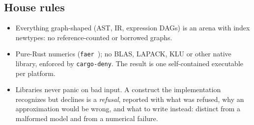 \subsection{House rules}
\begin{itemize}
  \item Everything graph-shaped (AST, IR, expression DAGs) is an arena with index newtypes: no
  reference-counted or borrowed graphs.
  \item Pure-Rust numerics (\texttt{faer}~\cite{faer}); no BLAS, LAPACK, KLU or other native
  library, enforced by \texttt{cargo-deny}. The result is one self-contained executable per
  platform.
  \item Libraries never panic on bad input. A construct the implementation recognizes but
  declines is a \emph{refusal}, reported with what was refused, why an approximation would be
  wrong, and what to write instead: distinct from a malformed model and from a numerical failure.
\end{itemize}
